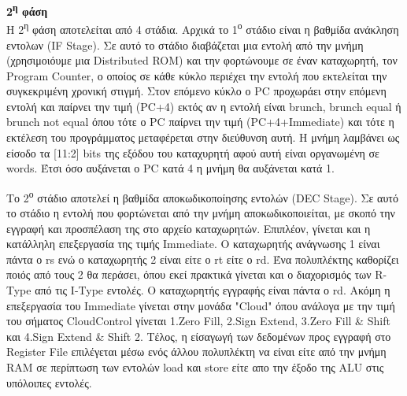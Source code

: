 \begin{justify}
    \textbf{2\textsuperscript{η} φάση}\\
    H 2\textsuperscript{η} φάση αποτελείται από
    4 στάδια. Αρχικά το 1\textsuperscript{ο} στάδιο
    είναι η βαθμίδα ανάκληση εντολων (\textlatin{IF Stage}).
    Σε αυτό το στάδιο διαβάζεται μια εντολή από την μνήμη
    (χρησιμοιόυμε μια \textlatin{Distributed ROM}) και την
    φορτώνουμε σε έναν καταχωρητή, τον \textlatin{Program Counter},
    ο οποίος σε κάθε κύκλο περιέχει την εντολή που εκτελείται
    την συγκεκριμένη χρονική στιγμή. Στον επόμενο κύκλο ο
    \textlatin{PC} προχωράει στην επόμενη εντολή και παίρνει
    την τιμή (\textlatin{{PC}+4}) εκτός αν η εντολή 
    είναι \textlatin{brunch, brunch equal} ή 
    \textlatin{brunch not equal} όπου τότε ο \textlatin{PC}
    παίρνει την τιμή (\textlatin{{PC}+4+Immediate}) και τότε
    η εκτέλεση του προγράμματος μεταφέρεται στην διεύθυνση
    αυτή. Η μνήμη λαμβάνει ως είσοδο τα [11:2] \textlatin{bits}
    της εξόδου του καταχυρητή αφού αυτή είναι οργανωμένη σε 
    \textlatin{words}. Έτσι όσο αυξάνεται ο \textlatin{PC} κατά 4
    η μνήμη θα αυξάνεται κατά 1.
\end{justify}

\begin{justify}
    Το 2\textsuperscript{ο} στάδιο αποτελεί η βαθμίδα
    αποκωδικοποίησης εντολών (\textlatin{DEC Stage}).
    Σε αυτό το στάδιο η εντολή που φορτώνεται από την μνήμη
    αποκωδικοποιείται, με σκοπό την εγγραφή και προσπέλαση της
    στο αρχείο καταχωρητών. Επιπλέον, γίνεται και η κατάλληλη
    επεξεργασία της τιμής \textlatin{Immediate}. Ο καταχωρητής
    ανάγνωσης 1 είναι πάντα ο \textlatin{rs} ενώ ο καταχωρητής
    2 είναι είτε ο \textlatin{rt} είτε ο \textlatin{rd}.
    Ένα πολυπλέκτης καθορίζει ποιός από τους 2 θα περάσει,
    όπου εκεί πρακτικά γίνεται και ο διαχορισμός των \textlatin{R-Type}
    από τις \textlatin{I-Type} εντολές. Ο καταχωρητής εγγραφής
    είναι πάντα ο \textlatin{rd}. Ακόμη η επεξεργασία του
    \textlatin{Immediate} γίνεται στην μονάδα \textlatin{"Cloud"}
    όπου ανάλογα με την τιμή του σήματος \textlatin{CloudControl}
    γίνεται \textlatin{1.Zero Fill}, \textlatin{2.Sign Extend},
    \textlatin{3.Zero Fill \& Shift} και \textlatin{4.Sign Extend \& Shift 2}.
    Tέλος, η είσαγωγή των δεδομένων προς εγγραφή στο 
    \textlatin{Register File} επιλέγεται μέσω ενός άλλου
    πολυπλέκτη να είναι είτε από την μνήμη \textlatin{RAM}
    σε περίπτωση των εντολών \textlatin{load} και \textlatin{store}
    είτε απο την έξοδο της \textlatin{ALU} στις υπόλοιπες εντολές.
\end{justify}

